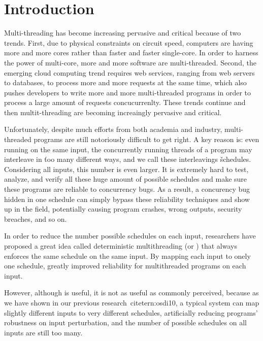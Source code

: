 \section{Introduction} \label{ch:intro}

Multi-threading has become increasing pervasive and critical because of two 
trends. First, due to physical constraints on circuit speed, computers are having
more and more cores rather than faster and faster single-core. In order to 
harness the power of multi-core, more and more software are multi-threaded. 
Second, the emerging cloud computing trend requires web services, ranging from 
web servers to databases, to process more and more requests at the same time, which also 
pushes developers to write more and more multi-threaded programs in order to 
process a large amount of requests concucurrenlty. These trends continue and 
then multit-threading are becoming increaingly pervasive and critical.

Unfortunately, despite much efforts from both academia and industry, 
multi-threaded programs are still notoriously difficult to get right. A key 
reason is: even running on the same input, the concurrently running threads of 
a program may interleave in \v{too many} different ways, and we call these interleavings 
\v{schedules}. Considering all inputs, this number is even larger. 
It is extremely hard to test, analyze, and verify all these huge 
amount of possible schedules and make sure these programs are reliable to 
concurrency bugs. As a result, a concurency bug hidden in one schedule can 
simply bypass these reliability techniques and show up in the field, 
potentially causing program crashes, wrong outputs, security breaches, and so on.

In order to reduce the number possible schedules on each input, researchers 
have proposed a great idea called deterministic multithreading (or \dmt) that 
always enforces the same schedule on the same input. By mapping each input to onely 
one schedule, \dmt greatly improved reliability for multithreaded programs on each input.

However, although \dmt is useful, it is not as useful as commonly perceived, 
because as we have shown in our previous research~cite{tern:osdi10},
a typical \dmt system can map slightly different inputs to 
very different schedules, artificially reducing programs' robustness on input 
perturbation, and the number of possible schedules on all inputs are still too 
many.

